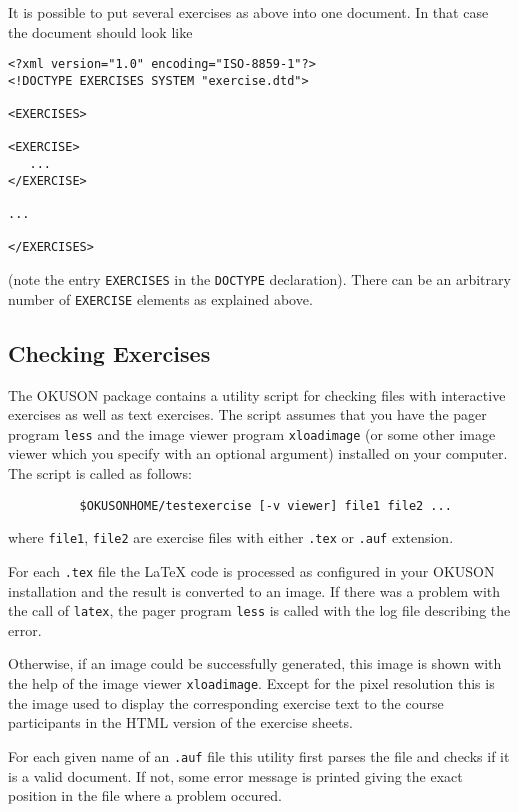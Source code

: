 \documentclass[12pt,openany,a4paper]{book}
\newcommand{\OKUSON}{\textsf{OKUSON}}
\begin{document}
It is possible to put several exercises as above into one document. In that
case the document should look like

\begin{verbatim}
<?xml version="1.0" encoding="ISO-8859-1"?>
<!DOCTYPE EXERCISES SYSTEM "exercise.dtd">

<EXERCISES>

<EXERCISE>
   ...
</EXERCISE>
   
...

</EXERCISES>

\end{verbatim}

(note the entry \texttt{EXERCISES} in the \texttt{DOCTYPE} declaration).
There can be an arbitrary number of \texttt{EXERCISE} elements as explained
above.

\subsection*{Checking Exercises}\label{ssec:checkexercise}

The {\OKUSON} package contains a utility script for checking files with
interactive exercises as well as text exercises. 
The script assumes that you have the pager program
\texttt{less} and the image viewer program \texttt{xloadimage} (or some
other image viewer which you specify with an optional argument) installed on
your computer. The  script is called as follows:

\verb+          $OKUSONHOME/testexercise [-v viewer] file1 file2 ...+

where \texttt{file1}, \texttt{file2} are exercise files with either
\texttt{.tex} or \texttt{.auf} extension. 

For each \texttt{.tex} file the {\LaTeX} code is processed as configured in
your {\OKUSON} installation and the result is converted to an image. If
there was a problem with the call of \texttt{latex}, the pager program
\texttt{less} is called with the log file describing the error. 

Otherwise, if an image could be successfully generated, this image is shown
with the help of the  image viewer \texttt{xloadimage}. Except for
the pixel resolution this is the image used to display the corresponding
exercise text to the course participants in the HTML version of the exercise
sheets.

For each given name of an \texttt{.auf} file this utility first parses the
file and checks if it is a valid document. If not, some error
message is printed giving the exact position in the file where a 
problem occured.
\end{document}

